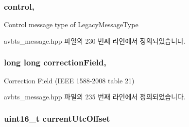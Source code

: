 \subsubsection[{\texorpdfstring{control}{control}}]{ control\hspace{0.3cm}{\ttfamily [protected]}, {\ttfamily [inherited]}}\hypertarget{class_p_t_p_message_common_a7de6f8422e6ca5ade1aeac73a44ec6f0}{}\label{class_p_t_p_message_common_a7de6f8422e6ca5ade1aeac73a44ec6f0}
Control message type of Legacy\+Message\+Type 

avbts\+\_\+message.\+hpp 파일의 230 번째 라인에서 정의되었습니다.

\subsubsection[{\texorpdfstring{correction\+Field}{correctionField}}]{\setlength{\rightskip}{0pt plus 5cm}long long correction\+Field\hspace{0.3cm}{\ttfamily [protected]}, {\ttfamily [inherited]}}\hypertarget{class_p_t_p_message_common_a635b707dac6610b5b159be5c8ec1891e}{}\label{class_p_t_p_message_common_a635b707dac6610b5b159be5c8ec1891e}
Correction Field (I\+E\+EE 1588-\/2008 table 21) 

avbts\+\_\+message.\+hpp 파일의 235 번째 라인에서 정의되었습니다.

\subsubsection[{\texorpdfstring{current\+Utc\+Offset}{currentUtcOffset}}]{\setlength{\rightskip}{0pt plus 5cm}uint16\+\_\+t current\+Utc\+Offset\hspace{0.3cm}{\ttfamily [private]}}\hypertarget{class_p_t_p_message_announce_a4ee8eca04b1ccd7d8eaae5f0dd3a11fa}{}\label{class_p_t_p_message_announce_a4ee8eca04b1ccd7d8eaae5f0dd3a11fa}


